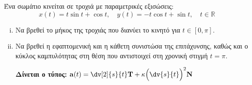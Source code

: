 \documentclass[a4paper,table]{report}
\begin{document}
\begin{mybox3}
  \begin{thema}
    Ένα σωμάτιο κινείται σε τροχιά με παραμετρικές εξισώσεις:
    \[
      x(t)=t \sin{t} + \cos{t}, \quad y(t)= -t \cos{t} + \sin{t}, \quad t \in \mathbb{R} 
    \] 
    \begin{enumerate}[i)]
      \item Να βρεθεί το μήκος της τροχιάς που διανύει το κινητό για $t \in [0, \pi] $.
      \item Να βρεθεί η εφαπτομενική και η κάθετη συνιστώσα της επιτάχυνσης, καθώς και ο 
        κύκλος καμπυλότητας στη θέση που αντιστοιχεί στη χρονική στιγμή $ t= \pi $.

        \hfill \textcolor{Col1}{\textbf{Δίνεται ο τύπος:}} $ \mathbf{a}(t) = \dv[2]{s}{t}
        \mathbf{T}+\kappa\Bigl(\dv{s}{t}\Bigr)^{2} \mathbf{N} $
    \end{enumerate}
  \end{thema}
\end{mybox3}
\end{document}
